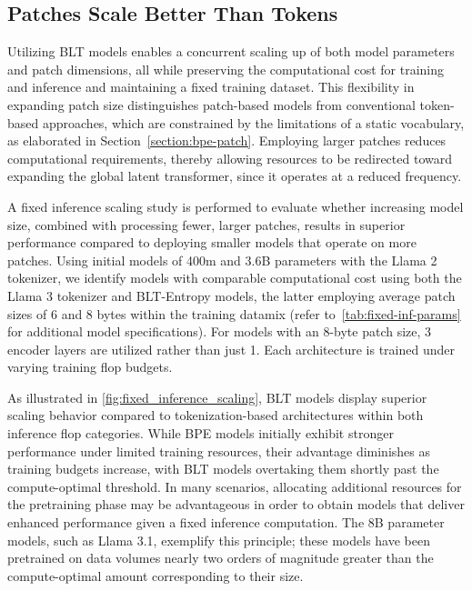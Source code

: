 \subsection{Patches Scale Better Than Tokens} Utilizing {\textsc BLT} models enables a concurrent scaling up of both model parameters and patch dimensions, all while preserving the computational cost for training and inference and maintaining a fixed training dataset. This flexibility in expanding patch size distinguishes patch-based models from conventional token-based approaches, which are constrained by the limitations of a static vocabulary, as elaborated in Section~\ref{section:bpe-patch}. Employing larger patches reduces computational requirements, thereby allowing resources to be redirected toward expanding the global latent transformer, since it operates at a reduced frequency.

A fixed inference scaling study is performed to evaluate whether increasing model size, combined with processing fewer, larger patches, results in superior performance compared to deploying smaller models that operate on more patches. Using initial models of 400m and 3.6B parameters with the Llama 2 tokenizer, we identify models with comparable computational cost using both the Llama 3 tokenizer and {\textsc BLT}-Entropy models, the latter employing average patch sizes of 6 and 8 bytes within the training datamix (refer to~\autoref{tab:fixed-inf-params} for additional model specifications). For models with an 8-byte patch size, 3 encoder layers are utilized rather than just 1. Each architecture is trained under varying training flop budgets.

As illustrated in \autoref{fig:fixed_inference_scaling}, {\textsc BLT} models display superior scaling behavior compared to tokenization-based architectures within both inference flop categories. While BPE models initially exhibit stronger performance under limited training resources, their advantage diminishes as training budgets increase, with {\textsc BLT} models overtaking them shortly past the compute-optimal threshold. In many scenarios, allocating additional resources for the pretraining phase may be advantageous in order to obtain models that deliver enhanced performance given a fixed inference computation. The 8B parameter models, such as Llama 3.1, exemplify this principle; these models have been pretrained on data volumes nearly two orders of magnitude greater than the compute-optimal amount corresponding to their size.

